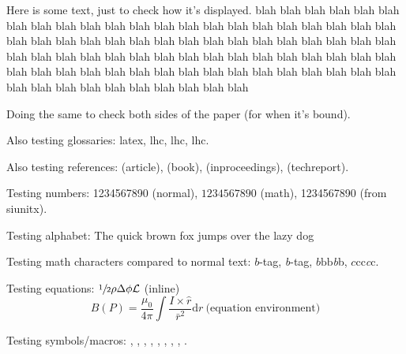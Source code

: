 \newpage

Here is some text, just to check how it's displayed. blah blah blah blah blah blah blah blah blah blah blah blah blah blah blah blah blah blah blah blah blah blah blah blah blah blah blah blah blah blah blah blah blah blah blah blah blah blah blah blah blah blah blah blah blah blah blah blah blah blah blah blah blah blah blah blah blah blah blah blah blah blah blah blah blah blah blah blah blah blah blah blah blah blah blah blah blah blah blah blah 

\newpage

Doing the same to check both sides of the paper (for when it's bound).

Also testing glossaries: \gls{latex}, \acrlong{lhc}, \acrshort{lhc}, \acrfull{lhc}.

Also testing references: \cite{CMS-PAPER-SUS-15-005-published} (article), \cite{tagkey1984quarksandleptons} (book), \cite{Lisanti:2016jxe} (inproceedings), \cite{CMS-PAS-SUS-15-005} (techreport).

Testing numbers: 1234567890 (normal), $1234567890$ (math), \si{1234567890} (from siunitx).

Testing alphabet: The quick brown fox jumps over the lazy dog

Testing math characters compared to normal text: $b$-tag, \emph{b}-tag, $b\mathrm{b}\text{b}$\emph{b}b, $c\mathrm{c}\text{c}$\emph{c}c.

Testing equations: $\sfrac{1}{2} \rho \Delta \phi \mathcal{L}$ (inline)
\begin{equation}
B(P) = \frac{\mu_0}{4\pi} \int \frac{I \times \hat{r}}{\bar{r}^2}\mathrm{d}r \ \text{(equation environment)}
\end{equation}

Testing symbols/macros: \eV, \MeV, \GeV, \TeV, \pt, \ptmiss, \met, \HT, \mht.

